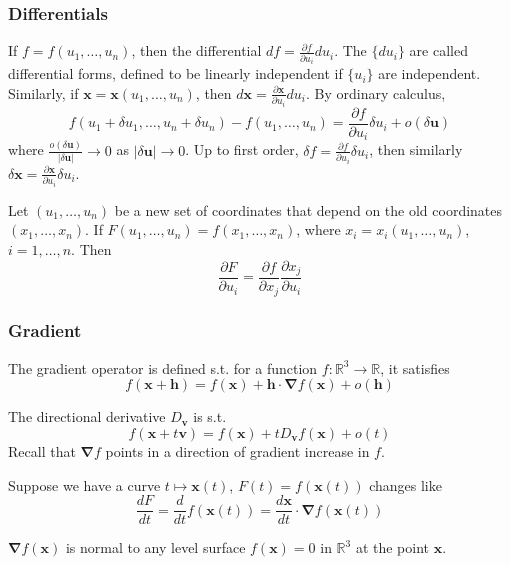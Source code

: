 \documentclass[a4paper]{article}
\begin{document}
\subsubsection*{Differentials}
If $f=f(u_1,\dots,u_n)$, then the differential $df=\frac{\partial f}{\partial u_i}du_i$. The $\{du_i\}$ are called differential forms, defined to be linearly independent if $\{u_i\}$ are independent. Similarly, if $\mathbf{x}=\mathbf{x}(u_1,\dots,u_n)$, then $d\mathbf{x}=\frac{\partial\mathbf{x}}{\partial u_i}du_i$. By ordinary calculus,
$$f(u_1+\delta u_1,\dots,u_n+\delta u_n)-f(u_1,\dots,u_n)=\frac{\partial f}{\partial u_i}\delta u_i+o(\delta\mathbf{u})$$
where $\frac{o(\delta\mathbf{u})}{|\delta\mathbf{u}|}\rightarrow 0$ as $|\delta\mathbf{u}|\rightarrow 0$. Up to first order,
$\delta f=\frac{\partial f}{\partial u_i}\delta u_i$, then similarly $\delta\mathbf{x}=\frac{\partial\mathbf{x}}{\partial u_i}\delta u_i$.
\begin{prop}
Let $(u_1,\dots,u_n)$ be a  new set of coordinates that depend on the old coordinates $(x_1,\dots,x_n)$. If $F(u_1,\dots,u_n)=f(x_1,\dots,x_n)$, where $x_i=x_i(u_1,\dots,u_n)$, $i=1,\dots,n$. Then
\begin{equation}
\frac{\partial F}{\partial u_i}=\frac{\partial f}{\partial x_j}\frac{\partial x_j}{\partial u_i}\tag{1.1}    
\end{equation}
\end{prop}
\subsubsection*{Gradient}
\begin{defi}
The gradient operator is defined s.t. for a function $f:\mathbb{R}^3\rightarrow\mathbb{R}$, it satisfies
$$f(\mathbf{x}+\mathbf{h})=f(\mathbf{x})+\mathbf{h}\cdot\boldsymbol{\nabla}f(\mathbf{x})+o(\mathbf{h})$$
\end{defi}
The directional derivative $D_{\mathbf{v}}$ is s.t.
$$f(\mathbf{x}+t\mathbf{v})=f(\mathbf{x})+tD_{\mathbf{v}}f(\mathbf{x})+o(t)$$
Recall that $\boldsymbol{\nabla}f$ points in a direction of gradient increase in $f$.
\begin{prop}
Suppose we have a curve $t\mapsto\mathbf{x}(t)$, $F(t)=f(\mathbf{x}(t))$ changes like
\begin{equation}
    \frac{dF}{dt}=\frac{d}{dt}f(\mathbf{x}(t))=\frac{d\mathbf{x}}{dt}\cdot\boldsymbol{\nabla}f(\mathbf{x}(t))\tag{1.2}
\end{equation}
\end{prop}
\begin{cor}
$\boldsymbol{\nabla}f(\mathbf{x})$ is normal to any level surface $f(\mathbf{x})=0$ in $\mathbb{R}^3$ at the point $\mathbf{x}$.
\end{cor}
\end{document}
